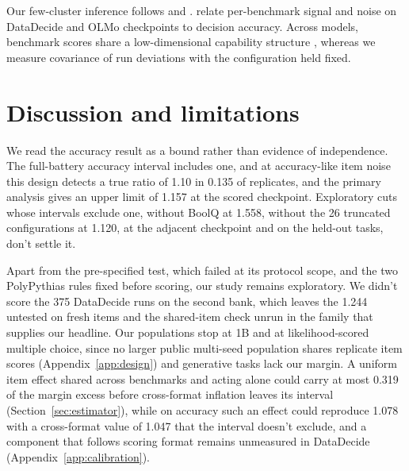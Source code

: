 Our few-cluster inference follows \citet{cameron2008} and \citet{mackinnon2017}. \citet{heineman2025} relate per-benchmark signal and noise on DataDecide and OLMo checkpoints to decision accuracy. Across models, benchmark scores share a low-dimensional capability structure \citep{ruan2024,burnell2023revealing}, whereas we measure covariance of run deviations with the configuration held fixed.

\section{Discussion and limitations}
We read the accuracy result as a bound rather than evidence of independence. The full-battery accuracy interval includes one, and at accuracy-like item noise this design detects a true ratio of 1.10 in 0.135 of replicates, and the primary analysis gives an upper limit of 1.157 at the scored checkpoint. Exploratory cuts whose intervals exclude one, without BoolQ at 1.558, without the 26 truncated configurations at 1.120, at the adjacent checkpoint and on the held-out tasks, don't settle it.

Apart from the pre-specified test, which failed at its protocol scope, and the two PolyPythias rules fixed before scoring, our study remains exploratory. We didn't score the 375 DataDecide runs on the second bank, which leaves the 1.244 untested on fresh items and the shared-item check unrun in the family that supplies our headline. Our populations stop at 1B and at likelihood-scored multiple choice, since no larger public multi-seed population shares replicate item scores (Appendix~\ref{app:design}) and generative tasks lack our margin. A uniform item effect shared across benchmarks and acting alone could carry at most 0.319 of the margin excess before cross-format inflation leaves its interval (Section~\ref{sec:estimator}), while on accuracy such an effect could reproduce 1.078 with a cross-format value of 1.047 that the interval  doesn't exclude, and a component that follows scoring format remains unmeasured in DataDecide (Appendix~\ref{app:calibration}).

